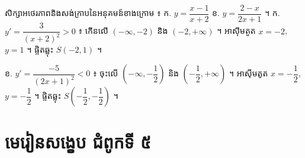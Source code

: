 \begin{pro}
សិក្សាអថេរភាពនិងសង់ក្រាបនៃអនុគមន៍ខាងក្រោម ៖ \quad ក. $y = \dfrac{x - 1}{x + 2}$ \quad ខ. $y = \dfrac{2 - x}{2x + 1}$ ។
\ans
ក. $y' = \dfrac{3}{(x + 2)^2} > 0$ ៖ កើនលើ $(-\infty, -2)$ និង $(-2, +\infty)$ ។ អាស៊ីមតូត $x = -2$, $y = 1$ ។ ផ្ចិតឆ្លុះ $S(-2, 1)$ ។

ខ. $y' = \dfrac{-5}{(2x + 1)^2} < 0$ ៖ ចុះលើ $\left(-\infty, -\dfrac{1}{2}\right)$ និង $\left(-\dfrac{1}{2}, +\infty\right)$ ។ អាស៊ីមតូត $x = -\dfrac{1}{2}$, $y = -\dfrac{1}{2}$ ។ ផ្ចិតឆ្លុះ $S\left(-\dfrac{1}{2}, -\dfrac{1}{2}\right)$ ។
\end{pro}

\section*{មេរៀនសង្ខេប ជំពូកទី ៥}
